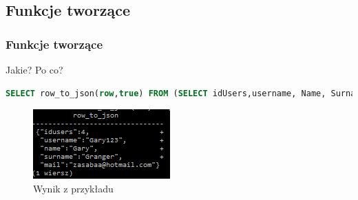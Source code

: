 \documentclass{beamer}
\begin{document}
\subsection{Funkcje tworzące}
\begin{frame}[fragile]
\frametitle{Funkcje tworzące}
Jakie? Po co?
\begin{lstlisting}[language=SQL,basicstyle=\footnotesize]
SELECT row_to_json(row,true) FROM (SELECT idUsers,username, Name, Surname, mail FROM Users WHERE idUsers=4) row;
\end{lstlisting}
\vspace{0.5cm}
\begin{figure}[h]
\begin{center}

\includegraphics[scale=1]{sc/44}

\end{center}
\caption{Wynik z przykładu}
\end{figure}



\end{frame}
\end{document}
